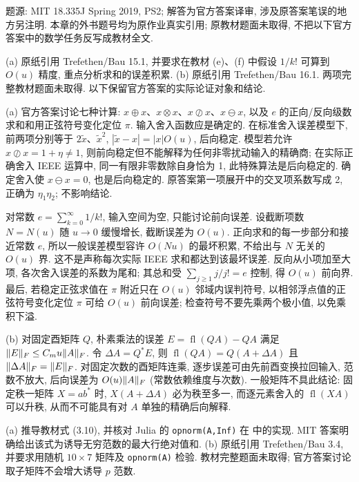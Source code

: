 \label{ass:ps2}
题源: MIT 18.335J Spring 2019, PS2; 解答为官方答案译审, 涉及原答案笔误的地方另注明. 本章的外书题号均为原作业真实引用; 原教材题面未取得, 不把以下官方答案中的数学任务反写成教材全文.
\begin{exercise}\label{ps2:q1}
(a) 原纸引用 Trefethen/Bau 15.1, 并要求在教材 (e)、(f) 中假设 $1/k!$ 可算到 $O(u)$ 精度, 重点分析求和的误差积累.
(b) 原纸引用 Trefethen/Bau 16.1. 两项完整教材题面未取得. 以下保留官方答案的实际论证对象和结论.
\end{exercise}
\begin{solution}
(a) 官方答案讨论七种计算: $x\oplus x$、$x\otimes x$、$x\oslash x$、$x\ominus x$, 以及 $e$ 的正向/反向级数求和和用正弦符号变化定位 $\pi$. 输入舍入函数应是确定的. 在标准舍入误差模型下, 前两项分别等于 $2\widetilde x$、$\widetilde x^2$, $|\widetilde x-x|=|x|O(u)$, 后向稳定. 模型若允许 $x\oslash x=1+\eta\ne1$, 则前向稳定但不能解释为任何非零扰动输入的精确商; 在实际正确舍入 IEEE 运算中, 同一有限非零数除自身恰为 1, 此特殊算法是后向稳定的. 确定舍入使 $x\ominus x=0$, 也是后向稳定的. 原答案第一项展开中的交叉项系数写成 2, 正确为 $\eta_1\eta_2$; 不影响结论.

对常数 $e=\sum_{k=0}^{\infty}1/k!$, 输入空间为空, 只能讨论前向误差. 设截断项数 $N=N(u)$ 随 $u\to0$ 缓慢增长, 截断误差为 $O(u)$. 正向求和的每一步部分和接近常数 $e$, 所以一般误差模型容许 $O(Nu)$ 的最坏积累, 不给出与 $N$ 无关的 $O(u)$ 界. 这不是声称每次实际 IEEE 求和都达到该最坏误差. 反向从小项加至大项, 各次舍入误差的系数为尾和; 其总和受 $\sum_{j\ge1}j/j!=e$ 控制, 得 $O(u)$ 前向界. 最后, 若稳定正弦求值在 $\pi$ 附近只在 $O(u)$ 邻域内误判符号, 以相邻浮点值的正弦符号变化定位 $\pi$ 可给 $O(u)$ 前向误差; 检查符号不要先乘两个极小值, 以免乘积下溢.

(b) 对固定酉矩阵 $Q$, 朴素乘法的误差 $E=\operatorname{fl}(QA)-QA$ 满足 $\lVert E\rVert_F\le C_m u\lVert A\rVert_F$. 令 $\Delta A=Q^*E$, 则 $\operatorname{fl}(QA)=Q(A+\Delta A)$ 且 $\lVert \Delta A\rVert_F=\lVert E\rVert_F$. 对固定次数的酉矩阵连乘, 逐步误差可由先前酉变换拉回输入, 范数不放大, 后向误差为 $O(u)\lVert A\rVert_F$ (常数依赖维度与次数). 一般矩阵不具此结论: 固定秩一矩阵 $X=ab^*$ 时, $X(A+\Delta A)$ 必为秩至多一, 而逐元素舍入的 $\operatorname{fl}(XA)$ 可以升秩, 从而不可能具有对 $A$ 单独的精确后向解释.
\end{solution}
\begin{exercise}\label{ps2:q2}
(a) 推导教材式 (3.10), 并核对 Julia 的 \texttt{opnorm(A,Inf)} 在  中的实现. MIT 答案明确给出该式为诱导无穷范数的最大行绝对值和.
(b) 原纸引用 Trefethen/Bau 3.4, 并要求用随机 $10\times7$ 矩阵及 \texttt{opnorm(A)} 检验. 教材完整题面未取得; 官方答案讨论取子矩阵不会增大诱导 $p$ 范数.
\end{exercise}
